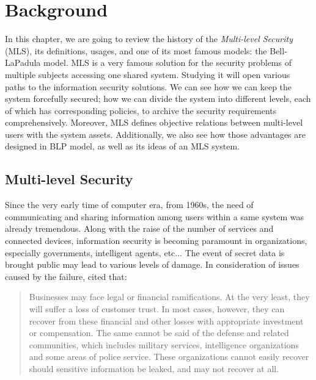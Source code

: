 
\chapter{Background} %

\label{ch:background} %


In this chapter, we are going to review the history of the \emph{Multi-level Security} (MLS), its definitions, usages, and one of its most famous models: the Bell-LaPadula model.
MLS is a very famous solution for the security problems of multiple subjects accessing one shared system. 
Studying it will open various paths to the information security solutions.
We can see how we can keep the system forcefully secured; 
how we can divide the system into different levels, each of which has corresponding policies, to archive the security requirements comprehensively.
Moreover, MLS defines objective relations between multi-level users with the system assets. 
Additionally, we also see how those advantages are designed in BLP model, as well as its ideas of an MLS system.


\section{Multi-level Security}
\label{ch:background:mls}

Since the very early time of computer era, from 1960s, the need of communicating and sharing information among users within a same system was already tremendous.
Along with the raise of the number of services and connected devices, information security is becoming paramount in organizations, especially governments, intelligent agents, etc...
The event of secret data is brought public may lead to various levels of damage.
In consideration of issues caused by the failure, \citeauthor{centos:2008} \cite{centos:2008} cited that:

\begin{quote}
Businesses may face legal or financial ramifications. At the very least, they will suffer a loss of customer trust. 
In most cases, however, they can recover from these financial and other losses with appropriate investment or compensation. 
The same cannot be said of the defense and related communities, which includes military services, intelligence organizations and some areas of police service.
These organizations cannot easily recover should sensitive information be leaked, and may not recover at all. 
\end{quote}

